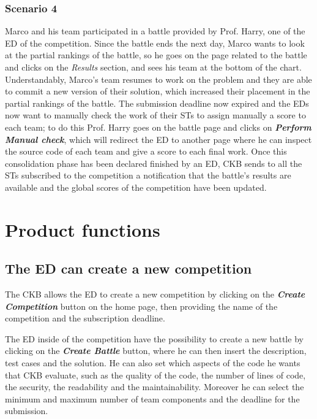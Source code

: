 \subsubsection*{Scenario 4}
Marco and his team participated in a battle provided by Prof. Harry, one of the ED of the competition. Since the battle ends the next day, Marco wants to look at the partial rankings of the battle, so he goes on the page related to the battle and clicks on the \textit{Results} section, and sees his team at the bottom of the chart. Understandably, Marco's team resumes to work on the problem and they are able to commit a new version of their solution, which increased their placement in the partial rankings of the battle. The submission deadline now expired and the EDs now want to manually check the work of their STs to assign manually a score to each team; to do this Prof. Harry goes on the battle page and clicks on \textbf{\textit{Perform Manual check}}, which will redirect the ED to another page where he can inspect the source code of each team and give a score to each final work. Once this consolidation phase has been declared finished by an ED, CKB sends to all the STs subscribed to the competition a notification that the battle's results are available and the global scores of the competition have been updated.


\section{Product functions}
\label{s:Product_functions}%

\subsection*{The ED can create a new competition}
The CKB allows the ED to create a new competition by clicking on the \textbf{\textit{Create Competition}} button on the home page, then providing the name of the competition and the subscription deadline.

The ED inside of the competition have the possibility to create a new battle by clicking on the \textbf{\textit{Create Battle}} button, where he can then insert the description, test cases and the solution. He can also set which aspects of the code he wants that CKB evaluate, such as the quality of the code, the number of lines of code, the security, the readability and the maintainability. Moreover he can select the minimum and maximum number of team components and the deadline for the submission.

